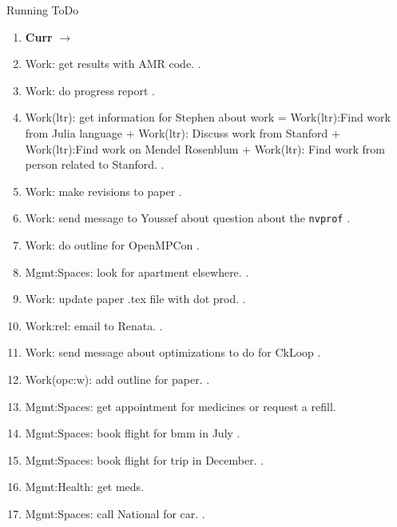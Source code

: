 \begin{multicols}{4}
\begin{columns}
\begin{column}{0.6\linewidth}
\begin{block}{Running ToDo}
\begin{enumerate}
    \item \tiny \textbf{Curr} $\rightarrow$ 
    \item \tiny Work: get results with AMR code. . 
    \item \tiny Work: do progress report . 
      
    \item \tiny Work(ltr): get information for Stephen about work =
      Work(ltr):Find work from Julia language + Work(ltr): Discuss
      work from Stanford + Work(ltr):Find work on Mendel Rosenblum +
      Work(ltr): Find work from person related to Stanford. . 

      \item \tiny Work: make revisions to paper .

      \item \tiny Work: send message to Youssef about question about
        the \texttt{nvprof} . 
      \item \tiny Work: do outline for OpenMPCon . 
      \item \tiny Mgmt:Spaces: look for apartment elsewhere. .

      \item \tiny Work: update paper .tex file with dot prod.  .

      \item \tiny Work:rel: email to Renata. . 

      \item \tiny Work: send message about optimizations to do for
        CkLoop  .

      \item \tiny Work(opc:w): add outline for paper. . 
        
      \item \tiny Mgmt:Spaces: get appointment for medicines or
        request a refill.  
      \item \tiny Mgmt:Spaces: book flight for bmm in July .

      \item \tiny Mgmt:Spaces: book flight for trip in December.
        . 

      \item \tiny Mgmt:Health: get meds.  

      \item \tiny Mgmt:Spaces: call National for car. . 


\end{enumerate}
\end{block}
\end{column}
\end{columns}
\end{multicols}

